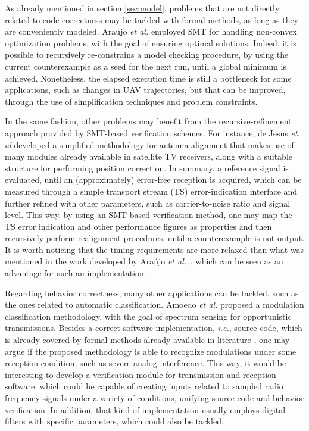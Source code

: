 \documentclass[format=acmsmall, review=false, screen=true]{acmart}
\begin{document}
{{As already mentioned in section \ref{sec:model}, problems that are not directly related to code correctness may be tackled with formal methods, as long as they are conveniently modeled. Ara\'ujo {\it et al.} \cite{Araujo16} employed SMT for handling non-convex optimization problems, with the goal of ensuring optimal solutions. Indeed, it is possible to recursively re-constrains a model checking procedure, by using the current counterexample as a seed for the next run, until a global minimum is achieved. Nonetheless, the elapsed execution time is still a bottleneck for some applications, such as changes in UAV trajectories, but that can be improved, through the use of simplification techniques and problem constraints.

In the same fashion, other problems may benefit from the recursive-refinement approach provided by SMT-based verification schemes. For instance, de Jesus {\it et. al} \cite{antennasbrt} developed a simplified methodology for antenna alignment that makes use of many modules already available in satellite TV receivers, along with a suitable structure for performing position correction. In summary, a reference signal is evaluated, until an (approximately) error-free reception is acquired, which can be measured through a simple transport stream (TS) error-indication interface and further refined with other parameters, such as carrier-to-noise ratio and signal level. This way, by using an SMT-based verification method, one may map the TS error indication and other performance figures as properties and then recursively perform realignment procedures, until a counterexample is not output. It is worth noticing that the timing requirements are more relaxed than what was mentioned in the work developed by Ara\'ujo {\it et al.}~\cite{Araujo16}, which can be seen as an advantage for such an implementation.

Regarding behavior correctness, many other applications can be tackled, such as the ones related to automatic classification. Amoedo {\it et al.} \cite{amoedo} proposed a modulation classification methodology, with the goal of spectrum sensing for opportunistic transmissions. Besides a correct software implementation, {\it i.e.}, source code, which is already covered by formal methods already available in literature \cite{esbmc_filter,Cordeiro12,Clarke04}, one may argue if the proposed methodology is able to recognize modulations under some reception condition, such as severe analog interference. This way, it would be interesting to develop a verification module for transmission and reception software, which could be capable of creating inputs related to sampled radio frequency signals under a variety of conditions, unifying source code and behavior verification. In addition, that kind of implementation usually employs digital filters with specific parameters, which could also be tackled.

}}
\end{document}
